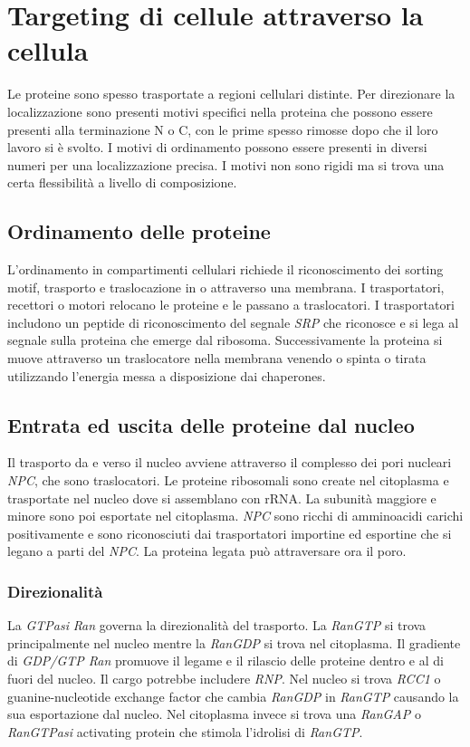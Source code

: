 \section{Targeting di cellule attraverso la cellula}
Le proteine sono spesso trasportate a regioni cellulari distinte. Per direzionare la localizzazione sono presenti motivi specifici nella proteina che possono essere presenti alla terminazione N o C, con le prime spesso rimosse
dopo che il loro lavoro si \`e svolto. I motivi di ordinamento possono essere presenti in diversi numeri per una localizzazione precisa. I motivi non sono rigidi ma si trova una certa flessibilit\`a a livello di composizione. 
\subsection{Ordinamento delle proteine}
L'ordinamento in compartimenti cellulari richiede il riconoscimento dei sorting motif, trasporto e traslocazione in o attraverso una membrana. I trasportatori, recettori o motori relocano le proteine e le passano a traslocatori.
I trasportatori includono un peptide di riconoscimento del segnale \emph{SRP} che riconosce e si lega al segnale sulla proteina che emerge dal ribosoma. Successivamente la proteina si muove attraverso un traslocatore nella
membrana venendo o spinta o tirata utilizzando l'energia messa a disposizione dai chaperones. 
\subsection{Entrata ed uscita delle proteine dal nucleo}
Il trasporto da e verso il nucleo avviene attraverso il complesso dei pori nucleari \emph{NPC}, che sono traslocatori. Le proteine ribosomali sono create nel citoplasma e trasportate nel nucleo dove si assemblano con rRNA\@. 
La subunit\`a maggiore e minore sono poi esportate nel citoplasma. \emph{NPC} sono ricchi di amminoacidi carichi positivamente e sono riconosciuti dai trasportatori importine ed esportine che si legano a parti del \emph{NPC}. 
La proteina legata pu\`o attraversare ora il poro. 
\subsubsection{Direzionalit\`a}
La \emph{GTPasi} \emph{Ran} governa la direzionalit\`a del trasporto. La \emph{RanGTP} si trova principalmente nel nucleo mentre la \emph{RanGDP} si trova nel citoplasma. Il gradiente di \emph{GDP/GTP Ran} promuove il legame e 
il rilascio delle proteine dentro e al di fuori del nucleo. Il cargo potrebbe includere \emph{RNP}. Nel nucleo si trova \emph{RCC1} o guanine-nucleotide exchange factor che cambia \emph{RanGDP} in \emph{RanGTP} causando la sua 
esportazione dal nucleo. Nel citoplasma invece si trova una \emph{RanGAP} o \emph{RanGTPasi} activating protein che stimola l'idrolisi di \emph{RanGTP}. 
